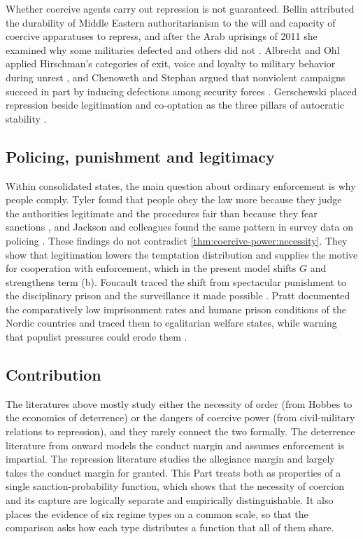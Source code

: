 \documentclass[11pt,letterpaper]{article}
\theoremstyle{definition}
\theoremstyle{remark}
\begin{document}
Whether coercive agents carry out repression is not guaranteed. Bellin attributed the durability of Middle Eastern authoritarianism to the will and capacity of coercive apparatuses to repress, and after the Arab uprisings of 2011 she examined why some militaries defected and others did not \citep{bellin2004,bellin2012}. Albrecht and Ohl applied Hirschman's categories of exit, voice and loyalty to military behavior during unrest \citep{albrecht2016}, and Chenoweth and Stephan argued that nonviolent campaigns succeed in part by inducing defections among security forces \citep{chenoweth2011}. Gerschewski placed repression beside legitimation and co-optation as the three pillars of autocratic stability \citep{gerschewski2013}.

\subsection{Policing, punishment and legitimacy}

Within consolidated states, the main question about ordinary enforcement is why people comply. Tyler found that people obey the law more because they judge the authorities legitimate and the procedures fair than because they fear sanctions \citep{tyler1990}, and Jackson and colleagues found the same pattern in survey data on policing \citep{jackson2012}. These findings do not contradict \cref{thm:coercive-power:necessity}. They show that legitimation lowers the temptation distribution and supplies the motive for cooperation with enforcement, which in the present model shifts $G$ and strengthens term (b). Foucault traced the shift from spectacular punishment to the disciplinary prison and the surveillance it made possible \citep{foucault1977}. Pratt documented the comparatively low imprisonment rates and humane prison conditions of the Nordic countries and traced them to egalitarian welfare states, while warning that populist pressures could erode them \citep{pratt2008a,pratt2008b}.

\subsection{Contribution}

The literatures above mostly study either the necessity of order (from Hobbes to the economics of deterrence) or the dangers of coercive power (from civil-military relations to repression), and they rarely connect the two formally. The deterrence literature from \citet{becker1968} onward models the conduct margin and assumes enforcement is impartial. The repression literature studies the allegiance margin and largely takes the conduct margin for granted. This Part treats both as properties of a single sanction-probability function, which shows that the necessity of coercion and its capture are logically separate and empirically distinguishable. It also places the evidence of six regime types on a common scale, so that the comparison asks how each type distributes a function that all of them share.
\end{document}
